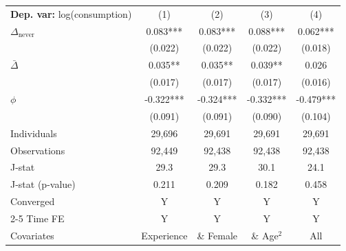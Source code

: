 \begin{tabular}{l cccc} \toprule  \textbf{Dep. var:}  log(consumption) 
                    &\multicolumn{1}{c}{(1)}   &\multicolumn{1}{c}{(2)}   &\multicolumn{1}{c}{(3)}   &\multicolumn{1}{c}{(4)}   \\

\addlinespace
$\Delta_{\text{never}}$&       0.083***&       0.083***&       0.088***&       0.062***\\
                    &     (0.022)   &     (0.022)   &     (0.022)   &     (0.018)   \\

\addlinespace
$\bar{\Delta}$      &       0.035** &       0.035** &       0.039** &       0.026   \\
                    &     (0.017)   &     (0.017)   &     (0.017)   &     (0.016)   \\

\addlinespace
$\phi$              &      -0.322***&      -0.324***&      -0.332***&      -0.479***\\
                    &     (0.091)   &     (0.091)   &     (0.090)   &     (0.104)   \\
\addlinespace
Individuals         &      29,696   &      29,691   &      29,691   &      29,691   \\
Observations        &      92,449   &      92,438   &      92,438   &      92,438   \\
J-stat              &        29.3   &        29.3   &        30.1   &        24.1   \\
J-stat (p-value)    &       0.211   &       0.209   &       0.182   &       0.458   \\
Converged           &           Y   &           Y   &           Y   &           Y   \\
\cmidrule{2-5} Time FE & Y & Y & Y & Y \\ Covariates & Experience & \& Female & \& Age$^2$ & All \\ \bottomrule \end{tabular}
